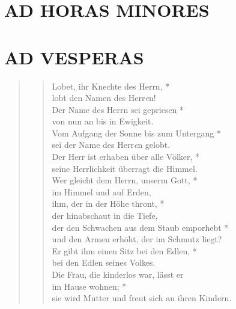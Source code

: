 \vspace{5cm}

\section{AD HORAS MINORES}

\newpage

\section[PSALMI DE FESTIS]{AD VESPERAS}



\begin{quote}

\begin{verse}
Lobet, ihr Knechte des Herrn, *\\
lobt den Namen des Herr\textit{e}n!\\ 
\vin Der Name des Herrn sei gepriesen *\\ 
\vin von nun an bis in Ewigkeit.\\
Vom Aufgang der Sonne bis zum Untergang *\\
sei der Name des Herr{\textit{e}}n gelobt.\\ 
\vin Der Herr ist erhaben über alle Völker, *\\ 
\vin seine Herrlichkeit überragt die Himmel.\\ 
Wer gleicht dem Herrn, unserm Gott, *\\
im Himmel und auf Erden,\\ 
\vin ihm, der in der Höhe thront, *\\ 
\vin der hinabschaut in die Tiefe, \\
der den Schwachen aus dem Staub emporhebt *\\
und den Armen erhöht, der im Schmutz liegt?\\ 
\vin Er gibt ihm einen Sitz bei den Edlen, *\\ 
\vin bei den Edlen seines Volkes.\\ 
Die Frau, die kinderlos war, lässt er\\
im Hause wohnen; *\\
sie wird Mutter und freut sich an ihren Kindern.\\ 

\end{verse}
\end{quote}

\vspace{0.3cm}



